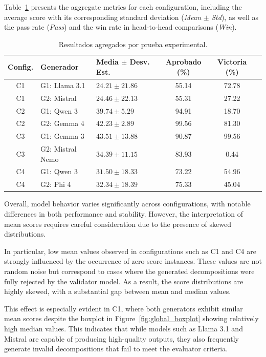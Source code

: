 \documentclass[pdflatex,sn-mathphys-num]{sn-jnl}%
\theoremstyle{thmstyleone}%
\theoremstyle{thmstyletwo}%
\theoremstyle{thmstylethree}%
\begin{document}
Table~\ref{tab:global_results} presents the aggregate metrics for each configuration, including the average score with its corresponding standard deviation (\textit{Mean} $\pm$ \textit{Std}), as well as the pass rate (\textit{Pass}) and the win rate in head-to-head comparisons (\textit{Win}).

\begin{table}[ht]
\centering
\caption{Resultados agregados por prueba experimental.}
\label{tab:global_results}
\begin{tabular}{cllccc}
\toprule
Config. & Generador & Media $\pm$ Desv. Est. & Aprobado (\%) & Victoria (\%) \\
\midrule
C1 & G1: Llama 3.1 & $24.21 \pm 21.86$ & 55.14 & 72.78 \\
C1 & G2: Mistral & $24.46 \pm 22.13$ & 55.31 & 27.22 \\
\midrule
C2 & G1: Qwen 3 & $39.74 \pm 5.29$ & 94.91 & 18.70 \\
C2 & G2: Gemma 4 & $42.23 \pm 2.89$ & 99.56 & 81.30 \\
\midrule
C3 & G1: Gemma 3 & $43.51 \pm 13.88$ & 90.87 & 99.56 \\
C3 & G2: Mistral Nemo & $34.39 \pm 11.15$ & 83.93 & 0.44 \\
\midrule
C4 & G1: Qwen 3 & $31.50 \pm 18.33$ & 73.22 & 54.96 \\
C4 & G2: Phi 4 & $32.34 \pm 18.39$ & 75.33 & 45.04 \\
\bottomrule
\end{tabular}
\end{table}

Overall, model behavior varies significantly across configurations, with notable differences in both performance and stability. However, the interpretation of mean scores requires careful consideration due to the presence of skewed distributions.

In particular, low mean values observed in configurations such as C1 and C4 are strongly influenced by the occurrence of zero-score instances. These values are not random noise but correspond to cases where the generated decompositions were fully rejected by the validator model. As a result, the score distributions are highly skewed, with a substantial gap between mean and median values.

This effect is especially evident in C1, where both generators exhibit similar mean scores despite the boxplot in Figure~\ref{fig:global_boxplot} showing relatively high median values. This indicates that while models such as Llama 3.1 and Mistral are capable of producing high-quality outputs, they also frequently generate invalid decompositions that fail to meet the evaluator criteria.
\end{document}
